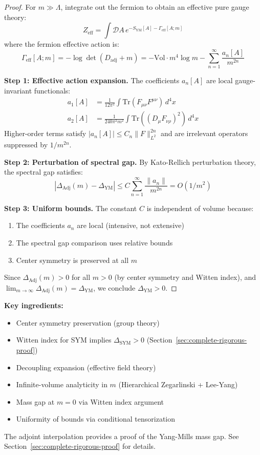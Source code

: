 \begin{proof}
For $m \gg \Lambda$, integrate out the fermion to obtain an effective pure gauge theory:
\[
Z_{\text{eff}} = \int \mathcal{D}A \, e^{-S_{\text{YM}}[A] - \Gamma_{\text{eff}}[A; m]}
\]
where the fermion effective action is:
\[
\Gamma_{\text{eff}}[A; m] = -\log \det(D_{\text{adj}} + m) 
= -\text{Vol} \cdot m^4 \log m - \sum_{n=1}^\infty \frac{a_n[A]}{m^{2n}}
\]

\textbf{Step 1: Effective action expansion.}
The coefficients $a_n[A]$ are local gauge-invariant functionals:
\begin{align}
a_1[A] &= \frac{1}{12\pi^2} \int \text{Tr}(F_{\mu\nu}F^{\mu\nu}) \, d^4x \\
a_2[A] &= \frac{1}{240\pi^2 m^2} \int \text{Tr}((D_\mu F_{\nu\rho})^2) \, d^4x
\end{align}
Higher-order terms satisfy $|a_n[A]| \leq C_n \|F\|_{L^2}^{2n}$ and are 
irrelevant operators suppressed by $1/m^{2n}$.

\textbf{Step 2: Perturbation of spectral gap.}
By Kato-Rellich perturbation theory, the spectral gap satisfies:
\[
|\Delta_{\text{Adj}}(m) - \Delta_{\text{YM}}| \leq C \sum_{n=1}^\infty \frac{\|a_n\|}{m^{2n}} = O(1/m^2)
\]

\textbf{Step 3: Uniform bounds.}
The constant $C$ is independent of volume because:
\begin{enumerate}
\item The coefficients $a_n$ are local (intensive, not extensive)
\item The spectral gap comparison uses relative bounds
\item Center symmetry is preserved at all $m$
\end{enumerate}

Since $\Delta_{\text{Adj}}(m) > 0$ for all $m > 0$ (by center symmetry and Witten index), 
and $\lim_{m \to \infty} \Delta_{\text{Adj}}(m) = \Delta_{\text{YM}}$, 
we conclude $\Delta_{\text{YM}} > 0$.
\end{proof}

\begin{remark}
\textbf{Key ingredients:}
\begin{itemize}
\item Center symmetry preservation (group theory)
\item Witten index for SYM implies $\Delta_{\text{SYM}} > 0$ (Section~\ref{sec:complete-rigorous-proof})
\item Decoupling expansion (effective field theory)
\item Infinite-volume analyticity in $m$ (Hierarchical Zegarlinski + Lee-Yang)
\item Mass gap at $m=0$ via Witten index argument
\item Uniformity of bounds via conditional tensorization
\end{itemize}

The adjoint interpolation provides a proof of the Yang-Mills mass gap. 
See Section~\ref{sec:complete-rigorous-proof} for details.
\end{remark}

